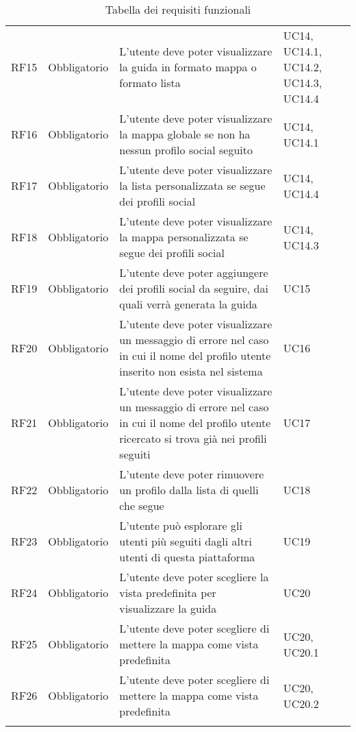 {\begin{longtable}{C{.15\freewidth} C{.2\freewidth} C{.528\freewidth} C{.15\freewidth}}
      RF15 & Obbligatorio & L'utente deve poter visualizzare la guida in formato mappa o formato lista & UC14, UC14.1, UC14.2, UC14.3, UC14.4 \\
      RF16 & Obbligatorio & L'utente deve poter visualizzare la mappa globale se non ha nessun profilo social seguito & UC14, UC14.1 \\
      RF17 & Obbligatorio & L'utente deve poter visualizzare la lista personalizzata se segue dei profili social & UC14, UC14.4 \\
      RF18 & Obbligatorio & L'utente deve poter visualizzare la mappa personalizzata se segue dei profili social & UC14, UC14.3 \\
      RF19 & Obbligatorio & L'utente deve poter aggiungere dei profili social da seguire, dai quali verrà generata la guida & UC15 \\
      RF20 & Obbligatorio & L'utente deve poter visualizzare un messaggio di errore nel caso in cui il nome del profilo utente inserito non esista nel sistema & UC16 \\
      RF21 & Obbligatorio & L'utente deve poter visualizzare un messaggio di errore nel caso in cui il nome del profilo utente ricercato si trova già nei profili seguiti & UC17 \\
      RF22 & Obbligatorio & L'utente deve poter rimuovere un profilo dalla lista di quelli che segue & UC18 \\
      RF23 & Obbligatorio & L'utente può esplorare gli utenti più seguiti dagli altri utenti di questa piattaforma & UC19 \\
      RF24 & Obbligatorio & L'utente deve poter scegliere la vista predefinita per visualizzare la guida & UC20 \\
      RF25 & Obbligatorio & L'utente deve poter scegliere di mettere la mappa come vista predefinita & UC20, UC20.1 \\
      RF26 & Obbligatorio & L'utente deve poter scegliere di mettere la mappa come vista predefinita & UC20, UC20.2 \\	   
      \bottomrule
      \caption{Tabella dei requisiti funzionali}
      \end{longtable}
}
